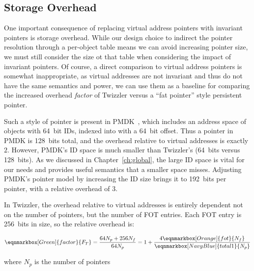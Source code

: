 \subsection{Storage Overhead}

One important consequence of replacing virtual address pointers with invariant pointers is storage
overhead. While our design choice to indirect the pointer resolution through a per-object table
means we can avoid increasing pointer size, we must still consider the size ot that table when
considering the impact of invariant pointers. Of course, a direct comparison to virtual address
pointers is somewhat inappropriate, as virtual addresses are not invariant and thus do not have the
same semantics and power, we can use them as a baseline for comparing the increased overhead
\emph{factor} of Twizzler versus a ``fat pointer'' style persistent pointer.

Such a style of pointer is present in PMDK~\cite{pmdk-pointers}, which includes an address space of
objects with 64~bit IDs, indexed into with a 64~bit offset. Thus a pointer in PMDK is 128~bits
total, and the overhead relative to virtual addresses is exactly $2$. However, PMDK's ID space is much
smaller than Twizzler's (64~bits versus 128~bits). As we discussed in Chapter~\ref{ch:global}, the
large ID space is vital for our needs and provides useful semantics that a smaller space misses.
Adjusting PMDK's pointer model by increasing the ID size brings it to 192~bits per pointer, with a
relative overhead of $3$.

In Twizzler, the overhead relative to virtual addresses is entirely dependent not on the number of
pointers, but the number of FOT entries. Each FOT entry is 256~bits in size, so the relative
overhead is:

\begin{equation*}
    \eqnmarkbox[Green]{factor}{F_T}
    = \frac{64
        N_p
        + 256
        N_f
    }{64
        N_p
    }
    = 1 + \frac{4
        \eqnmarkbox[Orange]{fot}{N_f}
    }{
        \eqnmarkbox[NavyBlue]{total1}{N_p}
    }
\end{equation*}
\vspace*{0.5em}


where $N_p$ is the number of pointers


